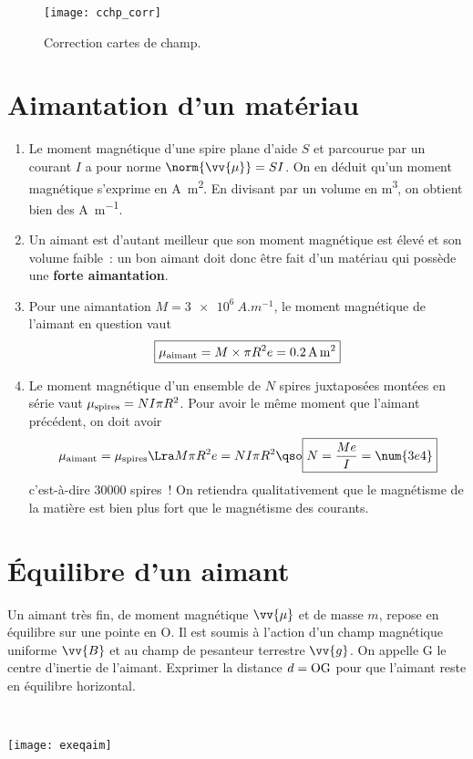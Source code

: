\documentclass[a4paper, 10pt, final, garamond]{book}
\begin{document}
\begin{figure}[h]
  \centering
  \texttt{[image: cchp\_corr]}
  \caption{Correction cartes de champ.}
  \label{fig:excchpcorr}
\end{figure}

\section{Aimantation d'un matériau}
\label{sec:aimat}
\begin{enumerate}
  \item Le moment magnétique d'une spire plane d'aide $S$ et parcourue par un
    courant $I$ a pour norme $\norm{\vv{\mu}} = SI$. On en déduit qu'un moment
    magnétique s'exprime en \si{A.m^2}. En divisant par un volume en \si{m^3},
    on obtient bien des \si{A.m^{-1}}.
  \item Un aimant est d'autant meilleur que son moment magnétique est élevé et
    son volume faible~: un bon aimant doit donc être fait d'un matériau qui
    possède une \textbf{forte aimantation}.
  \item Pour une aimantation $M = \SI{3e6}{A.m ^{-1}}$, le moment magnétique de
    l'aimant en question vaut
    \[
      \boxed{\mu_{\rm aimant} = M\times\pi R^2 e = \SI{0.2}{A.m^2}}
    \]
  \item Le moment magnétique d'un ensemble de $N$ spires juxtaposées montées en
    série vaut $\mu_{\rm spires} = NI\pi R^2$. Pour avoir le même moment que l'aimant
    précédent, on doit avoir
    \[
      \mu_{\rm aimant} = \mu_{\rm spires}
      \Lra 
      M\pi R^2 e = NI\pi R^2
      \qso
      \boxed{N = \frac{Me}{I} = \num{3e4}}
    \]
    c'est-à-dire \num{30000} spires~! On retiendra qualitativement que le
    magnétisme de la matière est bien plus fort que le magnétisme des courants.
\end{enumerate}

\section{Équilibre d'un aimant}
\label{sec:exeqaim}
\noindent
\begin{minipage}[t]{.7\linewidth}
  Un aimant très fin, de moment magnétique $\vv{\mu}$ et de masse $m$, repose en
  équilibre sur une pointe en O. Il est soumis à l'action d'un champ magnétique
  uniforme $\vv{B}$ et au champ de pesanteur terrestre $\vv{g}$. On appelle G le
  centre d'inertie de l'aimant.
  \smallbreak
  Exprimer la distance $d = \rm OG$ pour que l'aimant reste en équilibre
  horizontal.
\end{minipage}
\hfill
\begin{minipage}[t]{.3\linewidth}
  ~
  \vspace*{-20pt}
  \begin{center}
    \texttt{[image: exeqaim]}
    \label{fig:exeqaim}
  \end{center}
\end{minipage}
\end{document}
